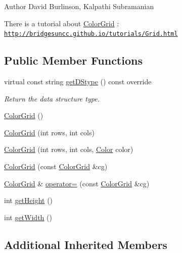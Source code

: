 \begin{DoxyAuthor}{Author}
David Burlinson, Kalpathi Subramanian
\end{DoxyAuthor}
There is a tutorial about \hyperlink{classbridges_1_1datastructure_1_1_color_grid}{Color\+Grid} \+: \href{http://bridgesuncc.github.io/tutorials/Grid.html}{\tt http\+://bridgesuncc.\+github.\+io/tutorials/\+Grid.\+html} \subsection*{Public Member Functions}
\begin{DoxyCompactItemize}
\item 
virtual const string \hyperlink{classbridges_1_1datastructure_1_1_color_grid_afad945d648b427ca183a1dface8249b7}{get\+D\+Stype} () const override
\begin{DoxyCompactList}\small\item\em Return the data structure type. \end{DoxyCompactList}\item 
\hyperlink{classbridges_1_1datastructure_1_1_color_grid_afe6bd7f8bf0dddd889ad7b6c159e928a}{Color\+Grid} ()
\item 
\hyperlink{classbridges_1_1datastructure_1_1_color_grid_a96a8df5eab72fb32c358ba12f2d4483b}{Color\+Grid} (int rows, int cols)
\item 
\hyperlink{classbridges_1_1datastructure_1_1_color_grid_a28f65f52274748d314ee47089e961c2c}{Color\+Grid} (int rows, int cols, \hyperlink{classbridges_1_1datastructure_1_1_color}{Color} color)
\item 
\hyperlink{classbridges_1_1datastructure_1_1_color_grid_adf9b21649638aec97394825d6d09f34c}{Color\+Grid} (const \hyperlink{classbridges_1_1datastructure_1_1_color_grid}{Color\+Grid} \&cg)
\item 
\hyperlink{classbridges_1_1datastructure_1_1_color_grid}{Color\+Grid} \& \hyperlink{classbridges_1_1datastructure_1_1_color_grid_abb8b358357bdccbd22fea5cea4a9862e}{operator=} (const \hyperlink{classbridges_1_1datastructure_1_1_color_grid}{Color\+Grid} \&cg)
\item 
int \hyperlink{classbridges_1_1datastructure_1_1_color_grid_ab437905ec904f941cd58d3393c3a5700}{get\+Height} ()
\item 
int \hyperlink{classbridges_1_1datastructure_1_1_color_grid_a46b358c31927e34f2068202e0cc23ae0}{get\+Width} ()
\end{DoxyCompactItemize}
\subsection*{Additional Inherited Members}


